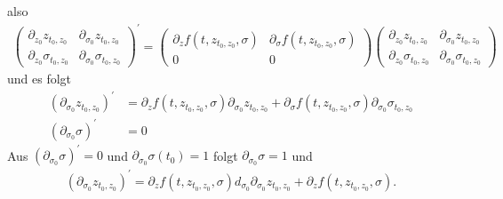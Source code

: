 \begin{solution}
\begin{enumerate}[label = \textbf{\alph*)}]
also
\begin{align*}
\begin{pmatrix}
  \partial_{z_0} z_{t_0,z_0} & \partial_{\sigma_0} z_{t_0,z_0} \\
  \partial_{z_0} \sigma_{t_0,z_0} & \partial_{\sigma_0} \sigma_{t_0,z_0}
\end{pmatrix}^{\prime}
=
\begin{pmatrix}
  \partial_{z} f(t,z_{t_0,z_0}, \sigma) & \partial_{\sigma} f(t,z_{t_0,z_0}, \sigma) \\
  0 & 0
\end{pmatrix}
\begin{pmatrix}
  \partial_{z_0} z_{t_0,z_0} & \partial_{\sigma_0} z_{t_0,z_0} \\
  \partial_{z_0} \sigma_{t_0,z_0} & \partial_{\sigma_0} \sigma_{t_0,z_0}
\end{pmatrix}
\end{align*}
und es folgt
\begin{align*}
  (\partial_{\sigma_0} z_{t_0,z_0})^{\prime} &= \partial_z f(t,z_{t_0,z_0},\sigma) \partial_{\sigma_0} z_{t_0,z_0}
  + \partial_{\sigma} f(t,z_{t_0,z_0},\sigma) \partial_{\sigma_0} \sigma_{t_0,z_0} \\
  (\partial_{\sigma_0} \sigma)^{\prime} &= 0
\end{align*}
Aus $(\partial_{\sigma_0} \sigma)^{\prime} = 0$ und $\partial_{\sigma_0}\sigma(t_0) = 1$
folgt $\partial_{\sigma_0} \sigma = 1$ und
\begin{align*}
  (\partial_{\sigma_0}z_{t_0,z_0})^{\prime} =
  \partial_z f(t,z_{t_0,z_0},\sigma)d_{\sigma_0}\partial_{\sigma_0} z_{t_0,z_0}
  + \partial_z f(t,z_{t_0,z_0},\sigma).
\end{align*}
\end{enumerate}
\end{solution}
